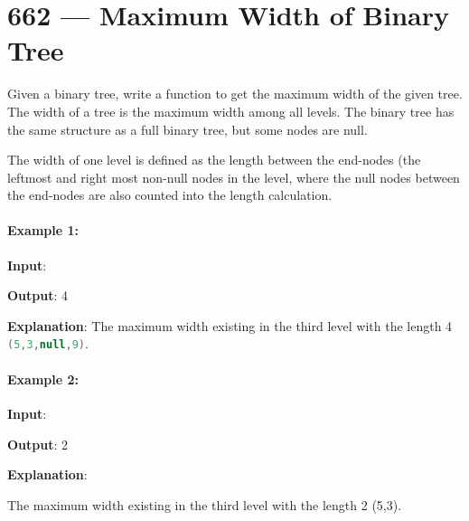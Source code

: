 \section{662 --- Maximum Width of Binary Tree}
Given a binary tree, write a function to get the maximum width of the given tree. The width of a tree is the maximum width among all levels. The binary tree has the same structure as a full binary tree, but some nodes are null.

The width of one level is defined as the length between the end-nodes (the leftmost and right most non-null nodes in the level, where the null nodes between the end-nodes are also counted into the length calculation.

\paragraph{Example 1:}

\begin{flushleft}
\textbf{Input}:

\begin{figure}[H]
\end{figure} 

\textbf{Output}: 4

\textbf{Explanation}: The maximum width existing in the third level with the length 4  \lstinline[language=Java, basicstyle=\small\ttfamily, keywordstyle=\bfseries\color{green!40!black}]|(5,3,null,9)|.
\end{flushleft}

\paragraph{Example 2:}

\begin{flushleft}
\textbf{Input}: 

\begin{figure}[H]
\end{figure}

\textbf{Output}: 2

\textbf{Explanation}: 

The maximum width existing in the third level with the length 2 (5,3).
\end{flushleft}


